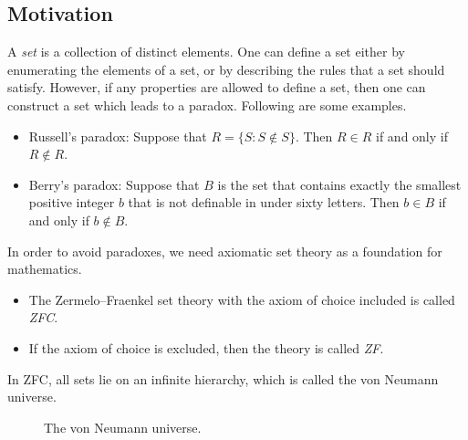 \documentclass[11pt]{article}
\DeclareMathOperator{\pow}{Pow}
\begin{document}
\subsection{Motivation}
A \emph{set} is a collection of distinct elements.
One can define a set either by enumerating the elements of a set, or by describing the rules that a set should satisfy.
However, if any properties are allowed to define a set, then one can construct a set which leads to a paradox.
Following are some examples.

\begin{itemize}
  \item Russell's paradox: Suppose that $R = \{S: S \notin S\}$. Then $R \in R$ if and only if $R \notin R$.
  \item Berry's paradox: Suppose that $B$ is the set that contains exactly the smallest positive integer $b$ that is not definable in under sixty letters. Then $b \in B$ if and only if $b \notin B$.
\end{itemize}
%
In order to avoid paradoxes, we need axiomatic set theory as a foundation for mathematics.

\begin{itemize}
  \item The Zermelo--Fraenkel set theory with the axiom of choice included is called \emph{ZFC}.
  \item If the axiom of choice is excluded, then the theory is called \emph{ZF}.
\end{itemize}
%
In ZFC, all sets lie on an infinite hierarchy, which is called the von Neumann universe.

\begin{figure}[h]
  \centering
  \caption{The von Neumann universe.}
\end{figure}
\end{document}
